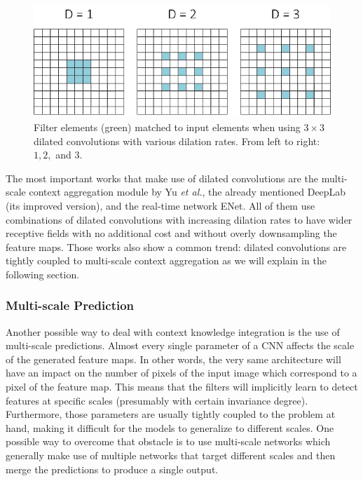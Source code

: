 \begin{figure}[!hbt]
	\centering
	\includegraphics[width=\linewidth]{Figures/Segmentation/dilatedconvolutions_rework.eps}
	\caption{Filter elements (green) matched to input elements when using $3\times3$ dilated convolutions with various dilation rates. From left to right: $1, 2, $ and $3$.}
	\label{fig:semseg:dilated-convolution-filter}
\end{figure}

The most important works that make use of dilated convolutions are the multi-scale context aggregation module by Yu \emph{et al.}\cite{Yu2015}, the already mentioned DeepLab (its improved version)\cite{Chen2016}, and the real-time network ENet\cite{Paszke2016}. All of them use combinations of dilated convolutions with increasing dilation rates to have wider receptive fields with no additional cost and without overly downsampling the feature maps. Those works also show a common trend: dilated convolutions are tightly coupled to multi-scale context aggregation as we will explain in the following section.

\subsubsection{Multi-scale Prediction}

Another possible way to deal with context knowledge integration is the use of multi-scale predictions. Almost every single parameter of a \acs{CNN} affects the scale of the generated feature maps. In other words, the very same architecture will have an impact on the number of pixels of the input image which correspond to a pixel of the feature map. This means that the filters will implicitly learn to detect features at specific scales (presumably with certain invariance degree). Furthermore, those parameters are usually tightly coupled to the problem at hand, making it difficult for the models to generalize to different scales. One possible way to overcome that obstacle is to use multi-scale networks which generally make use of multiple networks that target different scales and then merge the predictions to produce a single output.


